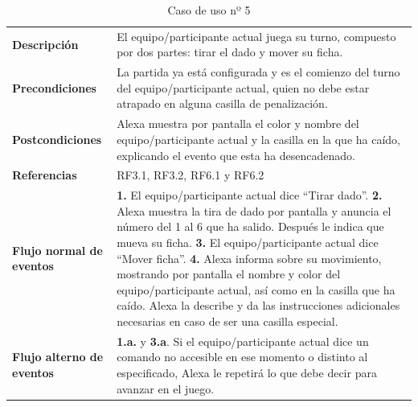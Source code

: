 \begin{table}[H]
	\centering
	\begin{tabular}{|p{3cm}|p{12cm}|}
		\hline
		\rowcolor{lightgray}
		\multicolumn{2}{|c|}{\textbf{CU05}: Jugar un turno} \\
		\hline
		\textbf{Descripción} & El equipo/participante actual juega su turno, compuesto por dos partes: tirar el dado y mover su ficha. \vspace{0.2cm} \\
		\hline
		\textbf{Precondiciones} & La partida ya está configurada y es el comienzo del turno del equipo/participante actual, quien no debe estar atrapado en alguna casilla de penalización. \vspace{0.2cm} \\
		\hline
		\textbf{Postcondiciones} & Alexa muestra por pantalla el color y nombre del equipo/participante actual y la casilla en la que ha caído, explicando el evento que esta ha desencadenado. \vspace{0.2cm} \\
		\hline
		\textbf{Referencias} & RF3.1, RF3.2, RF6.1 y RF6.2 \vspace{0.2cm} \\
		\hline
		\textbf{Flujo normal de eventos} &
		\textbf{1.} El equipo/participante actual dice \enquote{Tirar dado}. \newline
		\vspace{0.2cm}
		\textbf{2.} Alexa muestra la tira de dado por pantalla y anuncia el número del 1 al 6 que ha salido. Después le indica que mueva su ficha. \newline
		\vspace{0.2cm}
		\textbf{3.} El equipo/participante actual dice \enquote{Mover ficha}. \newline
		\vspace{0.2cm} 
		\textbf{4.} Alexa informa sobre su movimiento, mostrando por pantalla el nombre y color del equipo/participante actual, así como en la casilla que ha caído. Alexa la describe y da las instrucciones adicionales necesarias en caso de ser una casilla especial.
		\vspace{0.2cm}\\
		\hline
		\textbf{Flujo alterno de eventos} &
		\textbf{1.a.} y \textbf{3.a}. Si el equipo/participante actual dice un comando no accesible en ese momento o distinto al especificado, Alexa le repetirá lo que debe decir para avanzar en el juego. \vspace{0.2cm} \\
		\hline
	\end{tabular}
	\caption{Caso de uso nº 5}
	\label{tab:CU05}
\end{table}

